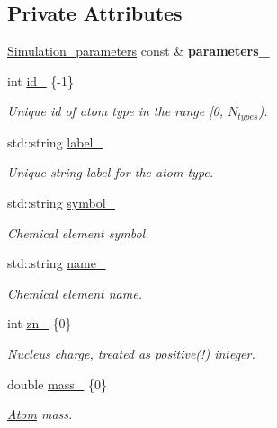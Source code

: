 \subsection*{Private Attributes}
\begin{DoxyCompactItemize}
\item 
\hypertarget{classsirius_1_1_atom__type_a26ee2d8f2b4a8548a0e255e93e994761}{}\hyperlink{classsirius_1_1_simulation__parameters}{Simulation\+\_\+parameters} const \& {\bfseries parameters\+\_\+}\label{classsirius_1_1_atom__type_a26ee2d8f2b4a8548a0e255e93e994761}

\item 
int \hyperlink{classsirius_1_1_atom__type_a1f751a3206e07d460ff16b15e52911e2}{id\+\_\+} \{-\/1\}
\begin{DoxyCompactList}\small\item\em Unique id of atom type in the range \mbox{[}0, $ N_{types} $). \end{DoxyCompactList}\item 
std\+::string \hyperlink{classsirius_1_1_atom__type_ad79bc28c0df0bc7819723e8013fba602}{label\+\_\+}
\begin{DoxyCompactList}\small\item\em Unique string label for the atom type. \end{DoxyCompactList}\item 
std\+::string \hyperlink{classsirius_1_1_atom__type_aa3090438a53985cf41d2ac57d92feda3}{symbol\+\_\+}
\begin{DoxyCompactList}\small\item\em Chemical element symbol. \end{DoxyCompactList}\item 
std\+::string \hyperlink{classsirius_1_1_atom__type_aaed973114158f85972d3aee81d4a5682}{name\+\_\+}
\begin{DoxyCompactList}\small\item\em Chemical element name. \end{DoxyCompactList}\item 
int \hyperlink{classsirius_1_1_atom__type_a8f913917b54707ed690586c8fa53c539}{zn\+\_\+} \{0\}
\begin{DoxyCompactList}\small\item\em Nucleus charge, treated as positive(!) integer. \end{DoxyCompactList}\item 
double \hyperlink{classsirius_1_1_atom__type_af09ff617fe4a88ec3083036b7aff9918}{mass\+\_\+} \{0\}
\begin{DoxyCompactList}\small\item\em \hyperlink{classsirius_1_1_atom}{Atom} mass. \end{DoxyCompactList}\item 

\end{DoxyCompactItemize}
